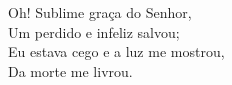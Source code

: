 Oh! Sublime graça do Senhor, \\
Um perdido e infeliz salvou; \\
Eu estava cego e a luz me mostrou, \\
Da morte me livrou. \\
